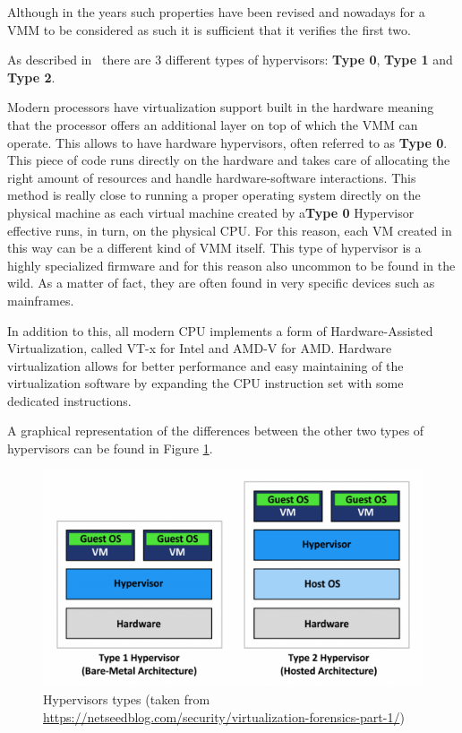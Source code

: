 Although in the years such properties have been revised and nowadays for a VMM to be considered as such it is sufficient that it verifies the first two. 

As described in~\cite{os} there are 3 different types of hypervisors: \textbf{Type 0}, \textbf{Type 1} and \textbf{Type 2}. 

Modern processors have virtualization support built in the hardware meaning that the processor offers an additional layer on top of which the VMM can operate. This allows to have hardware hypervisors, often referred to as \textbf{Type 0}. This piece of code runs directly on the hardware and takes care of allocating the right amount of resources and handle hardware-software interactions. This method is really close to running a proper operating system directly on the physical machine as each virtual machine created by a\textbf{Type 0} Hypervisor effective runs, in turn, on the physical CPU. For this reason, each VM created in this way can be a different kind of VMM itself. This type of hypervisor is a highly specialized firmware and for this reason also uncommon to be found in the wild. As a matter of fact, they are often found in very specific devices such as mainframes. 

In addition to this, all modern CPU implements a form of Hardware-Assisted Virtualization, called VT-x for Intel and AMD-V for AMD. Hardware virtualization allows for better performance and easy maintaining of the virtualization software by expanding the CPU instruction set with some dedicated instructions. 

A graphical representation of the differences between the other two types of hypervisors can be found in Figure \ref{fig:hip}.

\begin{figure}[htp]
\centering
\includegraphics[width=\linewidth]{images/hip.png}
\caption{Hypervisors types (taken from  \url{https://netseedblog.com/security/virtualization-forensics-part-1/})}
\label{fig:hip}
\end{figure}



